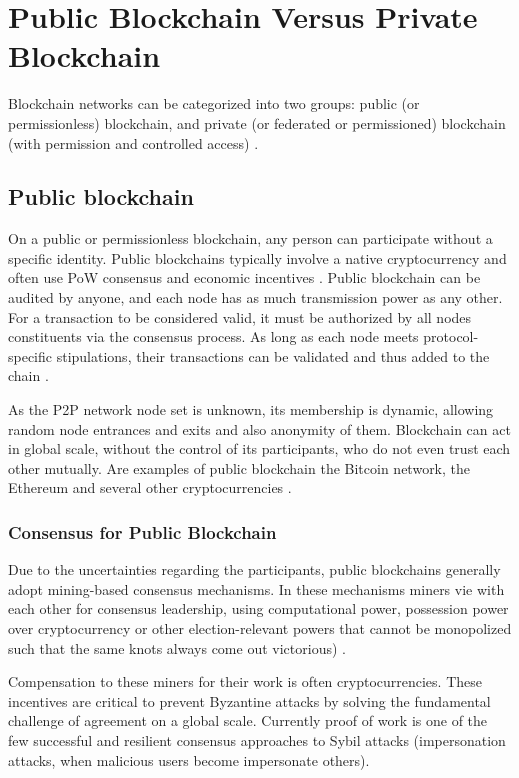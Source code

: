 \section{Public Blockchain Versus Private Blockchain}\label{sec:versus}

Blockchain networks can be categorized into two groups: public (or permissionless) blockchain, and private (or federated or permissioned) blockchain (with permission and controlled access) \cite{greve2018blockchain}.

\subsection{Public blockchain}\label{sec:blockchainPublica}
On a public or permissionless blockchain, any person can participate without a specific identity. Public blockchains typically involve a native cryptocurrency and often use \acf{PoW} consensus and economic incentives \cite{androulaki2018hyperledger}. Public blockchain can be audited by anyone, and each node has as much transmission power as any other. For a transaction to be considered valid, it must be authorized by all nodes constituents via the consensus process. As long as each node meets protocol-specific stipulations, their transactions can be validated and thus added to the chain \cite{Comstor2018}.

As the P2P network node set is unknown, its membership is dynamic, allowing random node entrances and exits and also anonymity of them. Blockchain can act in global scale, without the control of its participants, who do not even trust each other mutually. Are examples of public blockchain the Bitcoin network, the Ethereum and several other cryptocurrencies \cite{bashir2018mastering, antonopoulos2017mastering}.

\subsubsection{Consensus for Public Blockchain}\label{sec:consensoPublica}
Due to the uncertainties regarding the participants, public blockchains generally adopt mining-based consensus mechanisms. In these mechanisms miners vie with each other for consensus leadership, using computational power, possession power over cryptocurrency or other election-relevant powers that cannot be monopolized such that the same knots always come out victorious) \cite{greve2018blockchain}.

Compensation to these miners for their work is often cryptocurrencies. These incentives are critical to prevent Byzantine attacks by solving the fundamental challenge of agreement on a global scale. Currently proof of work is one of the few successful and resilient consensus approaches to Sybil attacks \cite{douceur2002sybil} (impersonation attacks, when malicious users become impersonate others).

